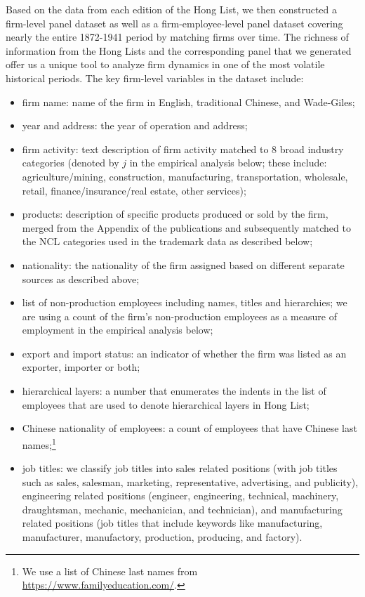 \documentclass[12pt]{article}
\begin{document}
Based on the data from each edition of the Hong List, we then constructed a firm-level panel dataset as well as a firm-employee-level panel dataset covering nearly the entire 1872-1941 period by matching firms over time. The richness of information from the Hong Lists and the corresponding panel that we generated offer us a unique tool to analyze firm dynamics in one of the most volatile historical periods. The key firm-level variables in the dataset include:

\vspace{0.2cm}

\begin{itemize}
\item firm name: name of the firm in English, traditional Chinese, and  Wade-Giles;
\item year and address: the year of operation and address;
\item firm activity: text description of firm activity matched to 8 broad industry categories (denoted by $j$ in the empirical analysis below; these include: agriculture/mining, construction, manufacturing, transportation, wholesale, retail, finance/insurance/real estate, other services);
\item products: description of specific products produced or sold by the firm, merged from the Appendix of the publications and subsequently matched to the NCL categories used in the trademark data as described below;
\item nationality: the nationality of the firm assigned based on different separate sources as described above; 
\item list of non-production employees including names, titles and hierarchies; we are using a count of the firm's non-production employees as a measure of employment in the empirical analysis below;
\item export and import status: an indicator of whether the firm was listed as an exporter, importer or both;
\item hierarchical layers: a number that enumerates the indents in the list of employees that are used to denote hierarchical layers in Hong List;
\item Chinese nationality of employees: a count of employees that have Chinese last names;\footnote{We use a list of Chinese last names from \url{https://www.familyeducation.com/}.}
\item job titles: we classify job titles into sales related positions (with job titles such as sales, salesman, marketing, representative, advertising, and publicity), engineering related positions (engineer, engineering, technical, machinery, draughtsman, mechanic, mechanician, and technician), and manufacturing related positions (job titles that include keywords like manufacturing, manufacturer, manufactory, production, producing, and factory).
\end{itemize}
\end{document}
